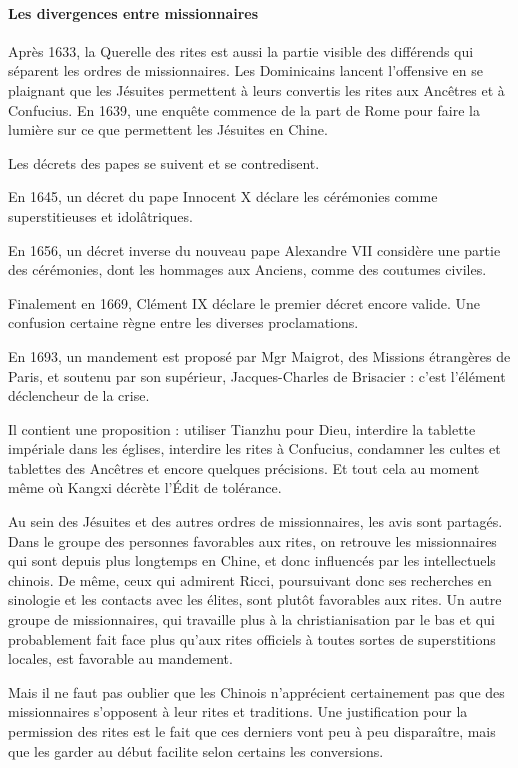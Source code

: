 \paragraph{Les divergences entre missionnaires}
Après 1633, la Querelle des rites est aussi la partie visible des différends qui séparent les ordres de missionnaires. Les Dominicains lancent l'offensive en se plaignant que les Jésuites permettent à leurs convertis les rites aux Ancêtres et à Confucius. En 1639, une enquête commence de la part de Rome pour faire la lumière sur ce que permettent les Jésuites en Chine.

Les décrets des papes se suivent et se contredisent.

En 1645, un décret du pape Innocent X déclare les cérémonies comme superstitieuses et idolâtriques.

En 1656, un décret inverse du nouveau pape Alexandre VII considère une partie des cérémonies, dont les hommages aux Anciens, comme des coutumes civiles.

Finalement en 1669, Clément IX déclare le premier décret encore valide. Une confusion certaine règne entre les diverses proclamations.

En 1693, un mandement est proposé par Mgr Maigrot, des Missions étrangères de Paris, et soutenu par son supérieur, Jacques-Charles de Brisacier : c'est l'élément déclencheur de la crise.

Il contient une proposition : utiliser Tianzhu pour Dieu, interdire la tablette impériale dans les églises, interdire les rites à Confucius, condamner les cultes et tablettes des Ancêtres et encore quelques précisions. Et tout cela au moment même où Kangxi décrète l'Édit de tolérance.

Au sein des Jésuites et des autres ordres de missionnaires, les avis sont partagés. Dans le groupe des personnes favorables aux rites, on retrouve les missionnaires qui sont depuis plus longtemps en Chine, et donc influencés par les intellectuels chinois. De même, ceux qui admirent Ricci, poursuivant donc ses recherches en sinologie et les contacts avec les élites, sont plutôt favorables aux rites. Un autre groupe de missionnaires, qui travaille plus à la christianisation par le bas et qui probablement fait face plus qu'aux rites officiels à toutes sortes de superstitions locales, est favorable au mandement.

Mais il ne faut pas oublier que les Chinois n'apprécient certainement pas que des missionnaires s'opposent à leur rites et traditions. Une justification pour la permission des rites est le fait que ces derniers vont peu à peu disparaître, mais que les garder au début facilite selon certains les conversions.


